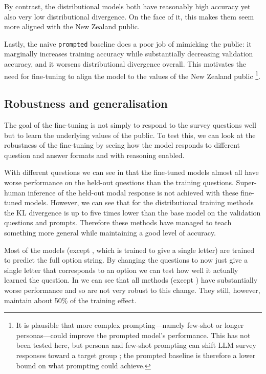 By contrast, the distributional models both have reasonably high accuracy yet also very low distributional divergence. On the face of it, this makes them seem more aligned with the New Zealand public.


Lastly, the naive \texttt{prompted} baseline does a poor job of mimicking the public: it marginally increases training accuracy while substantially decreasing validation accuracy, and it worsens distributional divergence overall. This motivates the need for fine-tuning to align the model to the values of the New Zealand public \footnote{It is plausible that more complex prompting—namely few-shot or longer personas—could improve the prompted model's performance. This has not been tested here, but persona and few-shot prompting can shift LLM survey responses toward a target group \cite{santurkarWhoseOpinionsLanguage2023,salewskiInContextImpersonationReveals2023}; the prompted baseline is therefore a lower bound on what prompting could achieve.}.

\subsection{Robustness and generalisation}

The goal of the fine-tuning is not simply to respond to the survey questions well but to learn the underlying values of the public. To test this, we can look at the robustness of the fine-tuning by seeing how the model responds to different question and answer formats and with reasoning enabled.

With different questions we can see in  that the fine-tuned models almost all have worse performance on the held-out questions than the training questions. Super-human inference of the held-out modal response is not achieved with these fine-tuned models. However, we can see that for the distributional training methods the KL divergence is up to five times lower than the base model on the validation questions and prompts. Therefore these methods have managed to teach something more general while maintaining a good level of accuracy.


Most of the models (except , which is trained to give a single letter) are trained to predict the full option string. By changing the questions to now just give a single letter that corresponds to an option we can test how well it actually learned the question. In  we can see that all methods (except ) have substantially worse performance and so are not very robust to this change. They still, however, maintain about 50\% of the training effect.

